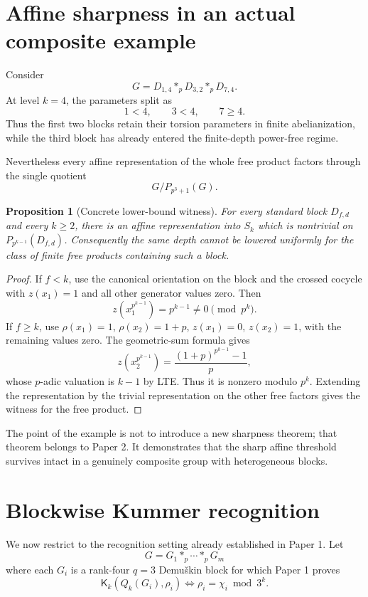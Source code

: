 \documentclass[11pt]{article}
\newtheorem{proposition}[theorem]{Proposition}
\begin{document}
\section{Affine sharpness in an actual composite example}

Consider
\[
G=D_{1,4}*_pD_{3,2}*_pD_{7,4}.
\]
At level $k=4$, the parameters split as
\[
1<4,\qquad 3<4,\qquad 7\ge4.
\]
Thus the first two blocks retain their torsion parameters in finite abelianization, while the third block has already entered the finite-depth power-free regime.

Nevertheless every affine representation of the whole free product factors through the single quotient
\[
G/P_{p^3+1}(G).
\]

\begin{proposition}[Concrete lower-bound witness]
For every standard block $D_{f,d}$ and every $k\ge2$, there is an affine representation into $S_k$ which is nontrivial on $P_{p^{k-1}}(D_{f,d})$. Consequently the same depth cannot be lowered uniformly for the class of finite free products containing such a block.
\end{proposition}

\begin{proof}
If $f<k$, use the canonical orientation on the block and the crossed cocycle with
$z(x_1)=1$ and all other generator values zero. Then
\[
z(x_1^{p^{k-1}})=p^{k-1}\ne0\pmod{p^k}.
\]
If $f\ge k$, use
$\rho(x_1)=1$, $\rho(x_2)=1+p$,
$z(x_1)=0$, $z(x_2)=1$, with the remaining values zero. The geometric-sum formula gives
\[
z(x_2^{p^{k-1}})
=\frac{(1+p)^{p^{k-1}}-1}{p},
\]
whose $p$-adic valuation is $k-1$ by LTE. Thus it is nonzero modulo $p^k$. Extending the representation by the trivial representation on the other free factors gives the witness for the free product.
\end{proof}

The point of the example is not to introduce a new sharpness theorem; that theorem belongs to Paper 2. It demonstrates that the sharp affine threshold survives intact in a genuinely composite group with heterogeneous blocks.

\section{Blockwise Kummer recognition}

We now restrict to the recognition setting already established in Paper 1. Let
\[
G=G_1*_p\cdots *_pG_m
\]
where each $G_i$ is a rank-four $q=3$ Demuškin block for which Paper 1 proves
\[
\mathsf K_k(Q_k(G_i),\rho_i)
\Longleftrightarrow
\rho_i=\chi_i\bmod 3^k.
\]
\end{document}
